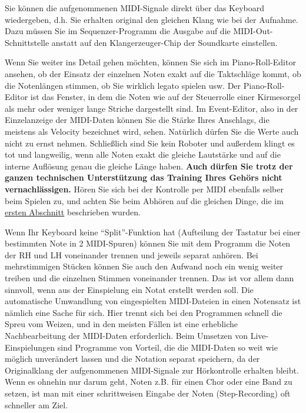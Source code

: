 Sie können die aufgenommenen MIDI-Signale direkt über das Keyboard wiedergeben, d.h. Sie erhalten original den gleichen Klang wie bei der Aufnahme.
Dazu müssen Sie im Sequenzer-Programm die Ausgabe auf die MIDI-Out-Schnittstelle anstatt auf den Klangerzeuger-Chip der Soundkarte einstellen.

\label{midi_check}

Wenn Sie weiter ins Detail gehen möchten, können Sie sich im Piano-Roll-Editor ansehen, ob der Einsatz der einzelnen Noten exakt auf die Taktschläge kommt, ob die Notenlängen stimmen, ob Sie wirklich legato spielen usw.
Der Piano-Roll-Editor ist das Fenster, in dem die Noten wie auf der Steuerrolle einer Kirmesorgel als mehr oder weniger lange Striche dargestellt sind.
Im Event-Editor, also in der Einzelanzeige der MIDI-Daten können Sie die Stärke Ihres Anschlags, die meistens als Velocity bezeichnet wird, sehen.
Natürlich dürfen Sie die Werte auch nicht zu ernst nehmen. Schließlich sind Sie kein Roboter und außerdem klingt es tot und langweilig, wenn alle Noten exakt die gleiche Lautstärke und auf die interne Auflösung genau die gleiche Länge haben.
\textbf{Auch dürfen Sie trotz der ganzen technischen Unterstützung das Training Ihres Gehörs nicht vernachlässigen.}
Hören Sie sich bei der Kontrolle per MIDI ebenfalls selber beim Spielen zu, und achten Sie beim Abhören auf die gleichen Dinge, die im \hyperref[c1iii13]{ersten Abschnitt} beschrieben wurden.

Wenn Ihr Keyboard keine \enquote{Split}-Funktion hat (Aufteilung der Tastatur bei einer bestimmten Note in 2 MIDI-Spuren) können Sie mit dem Programm die Noten der RH und LH voneinander trennen und jeweils separat anhören.
Bei mehrstimmigen Stücken können Sie auch den Aufwand noch ein wenig weiter treiben und die einzelnen Stimmen voneinander trennen.
Das ist vor allem dann sinnvoll, wenn aus der Einspielung ein Notat erstellt werden soll.
Die automatische Umwandlung von eingespielten MIDI-Dateien in einen Notensatz ist nämlich eine Sache für sich.
Hier trennt sich bei den Programmen schnell die Spreu vom Weizen, und in den meisten Fällen ist eine erhebliche Nachbearbeitung der MIDI-Daten erforderlich.
Beim Umsetzen von Live-Einspielungen sind Programme von Vorteil, die die MIDI-Daten so weit wie möglich unverändert lassen und die Notation separat speichern, da der Originalklang der aufgenommenen MIDI-Signale zur Hörkontrolle erhalten bleibt.
Wenn es ohnehin nur darum geht, Noten z.B. für einen Chor oder eine Band zu setzen, ist man mit einer schrittweisen Eingabe der Noten (Step-Recording) oft schneller am Ziel.


